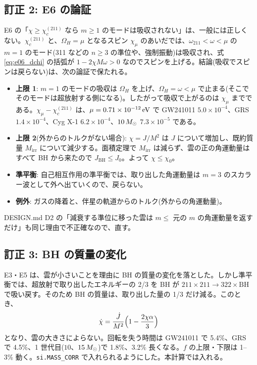 \subsection{訂正 2: E6 の論証}

E6 の「$\chi\ge\chi_c^{(211)}$ なら $m\ge1$ のモードは吸収されない」は、一般には正しくない。$\chi_c^{(211)}$ と、$\Omega_H=\mu$ となるスピン $\chi_\mu$ のあいだでは、$\omega_{211}<\omega<\mu$ の $m=1$ のモード(311 などの $n\ge3$ の準位や、強制振動)は吸収され、式 \eqref{eq:e06_dchi} の括弧が $1-2\chi M\omega>0$ なのでスピンを上げる。結論(吸収でスピンは戻らない)は、次の論証で保たれる。
\begin{itemize}
\item \textbf{上限 1}: $m=1$ のモードの吸収は $\Omega_H$ を上げ、$\Omega_H=\omega<\mu$ で止まる(そこでそのモードは超放射する側になる)。したがって吸収で上がるのは $\chi_\mu$ までである。$\chi_\mu-\chi_c^{(211)}$ は、$\mu=0.71\times10^{-12}\,\mathrm{eV}$ で GW241011 $5.0\times10^{-4}$、GRS $1.4\times10^{-4}$、Cyg X-1 $6.2\times10^{-4}$、$10\,M_\odot$ $7.3\times10^{-5}$ である。
\item \textbf{上限 2}(外からのトルクがない場合): $\chi=J/M^2$ は $J$ について増加し、既約質量 $M_\mathrm{irr}$ について減少する。面積定理で $M_\mathrm{irr}$ は減らず、雲の正の角運動量はすべて BH から来たので $J_\mathrm{BH}\le J_0$。よって $\chi\le\chi_0$。
\item \textbf{準平衡}: 自己相互作用の準平衡では、取り出した角運動量は $m=3$ のスカラー波として外へ出ていくので、戻らない。
\item \textbf{例外}: ガスの降着と、伴星の軌道からのトルク(外からの角運動量)。
\end{itemize}
DESIGN.md D2 の「減衰する準位に移った雲は $m\le$ 元の $m$ の角運動量を返すだけ」も同じ理由で不正確なので、直す。

\subsection{訂正 3: BH の質量の変化}

E3・E5 は、雲が小さいことを理由に BH の質量の変化を落とした。しかし準平衡では、超放射で取り出したエネルギーの 2/3 を BH が $211\times211\to322\times\mathrm{BH}$ で吸い戻す。そのため BH の質量は、取り出した量の 1/3 だけ減る。このとき、
\[
\dot\chi=\frac{\dot J}{M^2}\Bigl(1-\frac{2\chi\alpha}{3}\Bigr)
\]
となり、雲の大きさによらない。回転を失う時間は GW241011 で 5.4\%、GRS で 4.5\%、1 世代目($10$、$15\,M_\odot$)で 1.8\%、3.2\% 長くなる。$f$ の上限・下限は 1--3\% 動く。\texttt{si.MASS\_CORR} で入れられるようにした。本計算では入れる。

